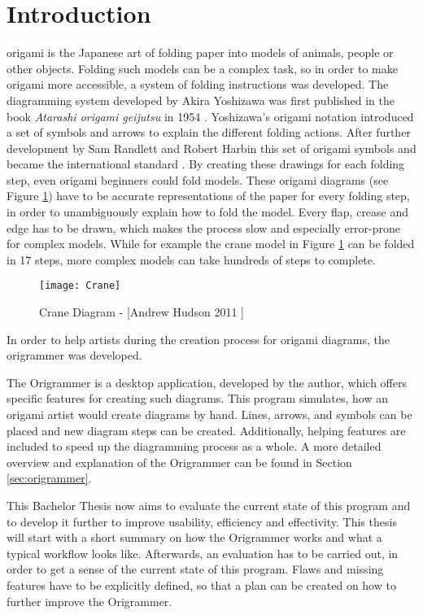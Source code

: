 
\section{Introduction}
\label{sec:introduction}

\gls{origami} is the Japanese art of folding paper into models of animals, people or other objects. Folding such models can be a complex task, so in order to make origami more accessible, a system of folding instructions was developed. The diagramming system developed by Akira Yoshizawa was first published in the book \emph{Atarashi origami geijutsu} in 1954 \cite{Yoshizawa}. Yoshizawa's origami notation introduced a set of symbols and arrows to explain the different folding actions. After further development by Sam Randlett and Robert Harbin this set of origami symbols and became the international standard\cite{origamiHistoryWu} \cite{origamiHistoryK}.
By creating these drawings for each folding step, even origami beginners could fold models. These origami diagrams (see Figure \ref{fig:craneDiagram}) have to be accurate representations of the paper for every folding step, in order to unambiguously explain how to fold the model. Every flap, crease and edge has to be drawn, which makes the process slow and especially error-prone for complex models. While for example the crane model in Figure \ref{fig:craneDiagram} can be folded in 17 steps, more complex models can take hundreds of steps to complete. 

\begin{figure}[htbp]
	\centering
	\texttt{[image: Crane]}
	\caption[Crane Diagram]{Crane Diagram - [Andrew Hudson 2011 \cite{Hudson}]}
	\label{fig:craneDiagram}
\end{figure}

In order to help artists during the creation process for origami diagrams, the \gls{origrammer} \cite{origrammer} was developed.

The Origrammer is a desktop application, developed by the author, which offers specific features for creating such diagrams. This program simulates, how an origami artist would create diagrams by hand. Lines, arrows, and symbols can be placed and new diagram steps can be created. Additionally, helping features are included to speed up the diagramming process as a whole. A more detailed overview and explanation of the Origrammer can be found in Section \ref{sec:origrammer}.

This Bachelor Thesis now aims to evaluate the current state of this program and to develop it further to improve usability, efficiency and effectivity. This thesis will start with a short summary on how the Origrammer works and what a typical workflow looks like. Afterwards, an evaluation has to be carried out, in order to get a sense of the current state of this program. Flaws and missing features have to be explicitly defined, so that a plan can be created on how to further improve the Origrammer.

